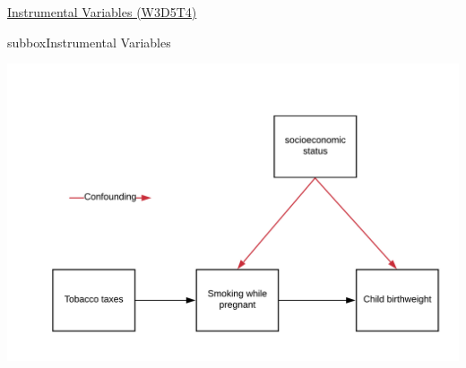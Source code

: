 \begin{textbox}{\href{https://compneuro.neuromatch.io/tutorials/W3D5_NetworkCausality/student/W3D5_Tutorial4.html}{Instrumental Variables (W3D5T4)}   }
\begin{subbox}{subbox}{Instrumental Variables}
\begin{center}
\includegraphics[scale=0.15]{Figures/NC/NC_Figure18.png}

\end{center}
\end{subbox}
\end{textbox}
